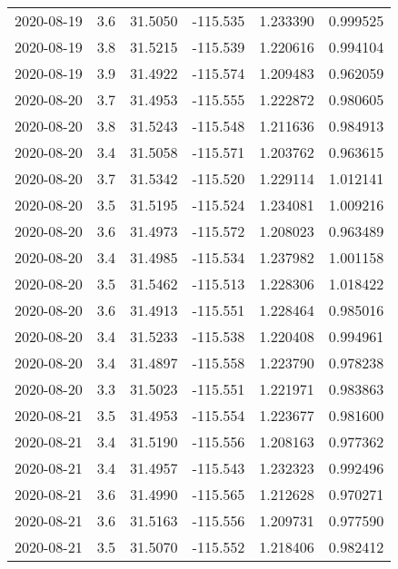 \begin{tabular}{lrrrrr}
2020-08-19 &       3.6 &  31.5050 &  -115.535 &         1.233390 &         0.999525 \\
2020-08-19 &       3.8 &  31.5215 &  -115.539 &         1.220616 &         0.994104 \\
2020-08-19 &       3.9 &  31.4922 &  -115.574 &         1.209483 &         0.962059 \\
2020-08-20 &       3.7 &  31.4953 &  -115.555 &         1.222872 &         0.980605 \\
2020-08-20 &       3.8 &  31.5243 &  -115.548 &         1.211636 &         0.984913 \\
2020-08-20 &       3.4 &  31.5058 &  -115.571 &         1.203762 &         0.963615 \\
2020-08-20 &       3.7 &  31.5342 &  -115.520 &         1.229114 &         1.012141 \\
2020-08-20 &       3.5 &  31.5195 &  -115.524 &         1.234081 &         1.009216 \\
2020-08-20 &       3.6 &  31.4973 &  -115.572 &         1.208023 &         0.963489 \\
2020-08-20 &       3.4 &  31.4985 &  -115.534 &         1.237982 &         1.001158 \\
2020-08-20 &       3.5 &  31.5462 &  -115.513 &         1.228306 &         1.018422 \\
2020-08-20 &       3.6 &  31.4913 &  -115.551 &         1.228464 &         0.985016 \\
2020-08-20 &       3.4 &  31.5233 &  -115.538 &         1.220408 &         0.994961 \\
2020-08-20 &       3.4 &  31.4897 &  -115.558 &         1.223790 &         0.978238 \\
2020-08-20 &       3.3 &  31.5023 &  -115.551 &         1.221971 &         0.983863 \\
2020-08-21 &       3.5 &  31.4953 &  -115.554 &         1.223677 &         0.981600 \\
2020-08-21 &       3.4 &  31.5190 &  -115.556 &         1.208163 &         0.977362 \\
2020-08-21 &       3.4 &  31.4957 &  -115.543 &         1.232323 &         0.992496 \\
2020-08-21 &       3.6 &  31.4990 &  -115.565 &         1.212628 &         0.970271 \\
2020-08-21 &       3.6 &  31.5163 &  -115.556 &         1.209731 &         0.977590 \\
2020-08-21 &       3.5 &  31.5070 &  -115.552 &         1.218406 &         0.982412 \\

\end{tabular}
